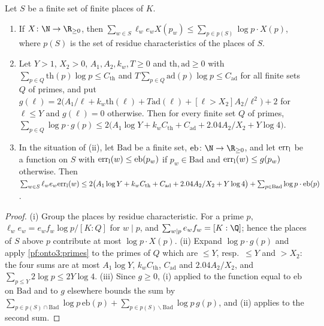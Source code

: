 \begin{lemma}\label{pf:onto3:placesum}
Let $S$ be a finite set of finite places of $K$.
\begin{enumerate}[label=(\roman*)]
\item If $X\colon\N\to\R_{\ge0}$, then $\sum_{w\in S}\ell_we_wX(p_w)\le\sum_{p\in p(S)}\log p\cdot X(p)$, where
$p(S)$ is the set of residue characteristics of the places of $S$.
\item Let $Y>1$, $X_2>0$, $A_1,A_2,k_w,T\ge0$ and $\mathrm{th},\mathrm{ad}\ge0$ with
$\sum_{p\in Q}\mathrm{th}(p)\log p\le C_{\mathrm{th}}$ and $T\sum_{p\in Q}\mathrm{ad}(p)\log p\le C_{\mathrm{ad}}$
for all finite sets $Q$ of primes, and put $g(\ell)=2\bigl(A_1/\ell+k_w\mathrm{th}(\ell)+T\mathrm{ad}(\ell)+
[\ell>X_2]A_2/\ell^2\bigr)+2$ for $\ell\le Y$ and $g(\ell)=0$ otherwise. Then for every finite set $Q$ of primes,
$\sum_{p\in Q}\log p\cdot g(p)\le2\bigl(A_1\log Y+k_wC_{\mathrm{th}}+C_{\mathrm{ad}}+2.04A_2/X_2+Y\log4\bigr)$.
\item In the situation of (ii), let $\mathrm{Bad}$ be a finite set, $\mathrm{eb}\colon\N\to\R_{\ge0}$, and let
$\mathrm{err}_{\mathrm{l}}$ be a function on $S$ with $\mathrm{err}_{\mathrm{l}}(w)\le\mathrm{eb}(p_w)$ if $p_w\in\mathrm{Bad}$ and
$\mathrm{err}_{\mathrm{l}}(w)\le g(p_w)$ otherwise. Then
$\sum_{w\in S}\ell_we_w\mathrm{err}_{\mathrm{l}}(w)\le2\bigl(A_1\log Y+k_wC_{\mathrm{th}}+C_{\mathrm{ad}}+2.04A_2/X_2+
Y\log4\bigr)+\sum_{p\in\mathrm{Bad}}\log p\cdot\mathrm{eb}(p)$.
\end{enumerate}
\end{lemma}

\begin{proof}
(i) Group the places by residue characteristic. For a prime $p$, $\ell_we_w=e_wf_w\log p/[K:Q]$ for $w\mid p$,
and $\sum_{w\mid p}e_wf_w=[K:\Q]$; hence the places of $S$ above $p$ contribute at most $\log p\cdot X(p)$.
(ii) Expand $\log p\cdot g(p)$ and apply \cref{pf:onto3:primes} to the primes of $Q$ which are $\le Y$, resp.\
$\le Y$ and $>X_2$: the four sums are at most $A_1\log Y$, $k_wC_{\mathrm{th}}$, $C_{\mathrm{ad}}$ and
$2.04A_2/X_2$, and $\sum_{p\le Y}2\log p\le2Y\log4$. (iii) Since $g\ge0$, (i) applied to the function equal to
$\mathrm{eb}$ on $\mathrm{Bad}$ and to $g$ elsewhere bounds the sum by
$\sum_{p\in p(S)\cap\mathrm{Bad}}\log p\,\mathrm{eb}(p)+\sum_{p\in p(S)\smallsetminus\mathrm{Bad}}\log p\,g(p)$,
and (ii) applies to the second sum.
\end{proof}

